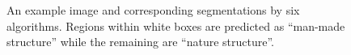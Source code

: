 \begin{figure}[t!]
    \caption{An example image and corresponding segmentations by six algorithms. Regions within white boxes are predicted as ``man-made structure'' while 
	the remaining are ``nature structure''. }   
    \label{fig:img_seg_example}
\end{figure}


